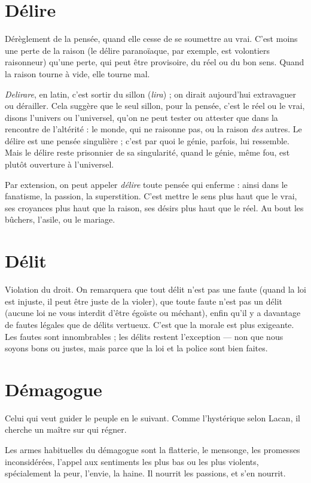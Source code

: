 \section{Délire}
Dérèglement de la pensée, quand elle cesse de se soumettre au vrai.
C’est moins une perte de la raison (le délire paranoïaque, par
exemple, est volontiers raisonneur) qu’une perte, qui peut être provisoire, du
réel ou du bon sens. Quand la raison tourne à vide, elle tourne mal.

{\it Delirare}, en latin, c’est sortir du sillon ({\it lira}) ; on dirait aujourd’hui extravaguer
ou dérailler. Cela suggère que le seul sillon, pour la pensée, c’est le réel ou
le vrai, disons l’univers ou l’universel, qu’on ne peut tester ou attester que dans
la rencontre de l’altérité : le monde, qui ne raisonne pas, ou la raison {\it des} autres.
Le délire est une pensée singulière ; c’est par quoi le génie, parfois, lui ressemble.
Mais le délire reste prisonnier de sa singularité, quand le génie, même
fou, est plutôt ouverture à l’universel.

Par extension, on peut appeler {\it délire} toute pensée qui enferme : ainsi dans
le fanatisme, la passion, la superstition. C’est mettre le sens plus haut que le
vrai, ses croyances plus haut que la raison, ses désirs plus haut que le réel. Au
bout les bûchers, l'asile, ou le mariage.

\section{Délit}
Violation du droit. On remarquera que tout délit n’est pas une faute
(quand la loi est injuste, il peut être juste de la violer), que toute
faute n’est pas un délit (aucune loi ne vous interdit d’être égoïste ou méchant),
enfin qu’il y a davantage de fautes légales que de délits vertueux. C’est que la
morale est plus exigeante. Les fautes sont innombrables ; les délits restent
l'exception — non que nous soyons bons ou justes, mais parce que la loi et la
police sont bien faites.

\section{Démagogue}
Celui qui veut guider le peuple en le suivant. Comme l'hystérique
selon Lacan, il cherche un maître sur qui régner.

Les armes habituelles du démagogue sont la flatterie, le mensonge, les promesses
inconsidérées, l'appel aux sentiments les plus bas ou les plus violents,
spécialement la peur, l'envie, la haine. Il nourrit les passions, et s’en nourrit.

